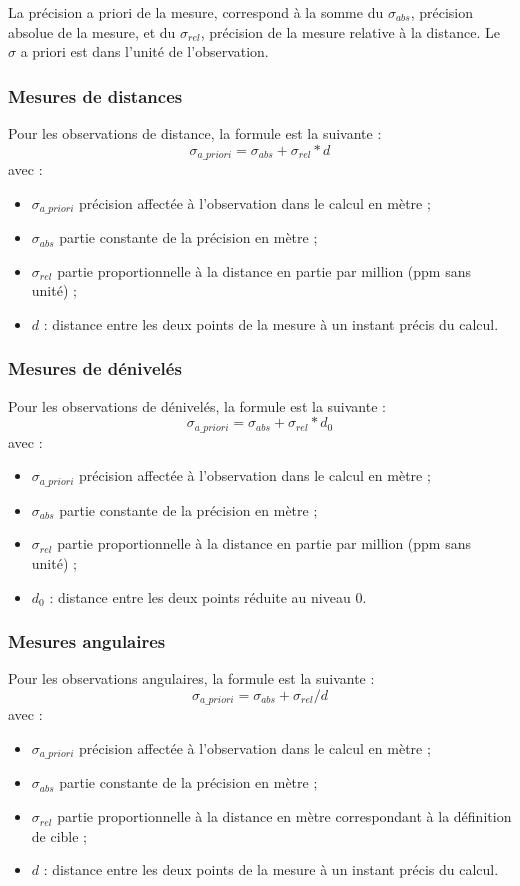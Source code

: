 \documentclass[french]{report}
\begin{document}
La précision a priori de la mesure, correspond à la somme du $\sigma_{abs}$, précision absolue
de la mesure, et du $\sigma_{rel}$, précision de la mesure relative à la distance.  Le $\sigma$ a priori est dans l'unité de l'observation.

\subsubsection{Mesures de distances}

Pour les observations de distance, la formule est la suivante :
$$\sigma_{a\_priori}=\sigma_{abs}+\sigma_{rel}*d$$
avec :
\begin{itemize}
	\item $\sigma_{a\_priori}$ précision affectée à l'observation dans le calcul en mètre ;
	\item $\sigma_{abs}$ partie constante de la précision en mètre ;
	\item $\sigma_{rel}$ partie proportionnelle à la distance en partie par million (ppm sans unité) ;
	\item $d$ : distance entre les deux points de la mesure à un instant précis du calcul.
\end{itemize}

\subsubsection{Mesures de dénivelés}

Pour les observations de dénivelés, la formule est la suivante :
$$\sigma_{a\_priori}=\sigma_{abs}+\sigma_{rel}*d_{0}$$
avec :
\begin{itemize}
	\item $\sigma_{a\_priori}$ précision affectée à l'observation dans le calcul en mètre ;
	\item $\sigma_{abs}$ partie constante de la précision en mètre ;
	\item $\sigma_{rel}$ partie proportionnelle à la distance en partie par million (ppm sans unité) ;
	\item $d_{0}$ : distance entre les deux points réduite au niveau 0.
\end{itemize}

\subsubsection{Mesures angulaires}

Pour les observations angulaires, la formule est la suivante :
$$\sigma_{a\_priori}=\sigma_{abs}+\sigma_{rel}/d$$
avec :
\begin{itemize}
	\item $\sigma_{a\_priori}$ précision affectée à l'observation dans le calcul en mètre ;
	\item $\sigma_{abs}$ partie constante de la précision en mètre ;
	\item $\sigma_{rel}$ partie proportionnelle à la distance en mètre correspondant à la définition de cible ;
	\item $d$ : distance entre les deux points de la mesure à un instant précis du calcul.
\end{itemize}
\end{document}
